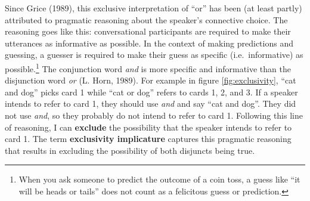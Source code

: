 \documentclass[oneside]{report}
\theoremstyle{definition}
\theoremstyle{definition}
\theoremstyle{definition}
\theoremstyle{remark}
\begin{document}
Since Grice (1989), this exclusive interpretation of ``or'' has been (at
least partly) attributed to pragmatic reasoning about the speaker's
connective choice. The reasoning goes like this: conversational
participants are required to make their utterances as informative as
possible. In the context of making predictions and guessing, a guesser
is required to make their guess as specific (i.e.~informative) as
possible.\footnote{When you ask someone to predict the outcome of a coin
  toss, a guess like ``it will be heads or tails'' does not count as a
  felicitous guess or prediction.} The conjunction word \emph{and} is
more specific and informative than the disjunction word \emph{or} (L.
Horn, 1989). For example in figure \ref{fig:exclusivity}, ``cat and
dog'' picks card 1 while ``cat or dog'' refers to cards 1, 2, and 3. If
a speaker intends to refer to card 1, they should use \emph{and} and say
``cat and dog''. They did not use \emph{and}, so they probably do not
intend to refer to card 1. Following this line of reasoning, I can
\textbf{exclude} the possibility that the speaker intends to refer to
card 1. The term \textbf{exclusivity implicature} captures this
pragmatic reasoning that results in excluding the possibility of both
disjuncts being true.
\end{document}
